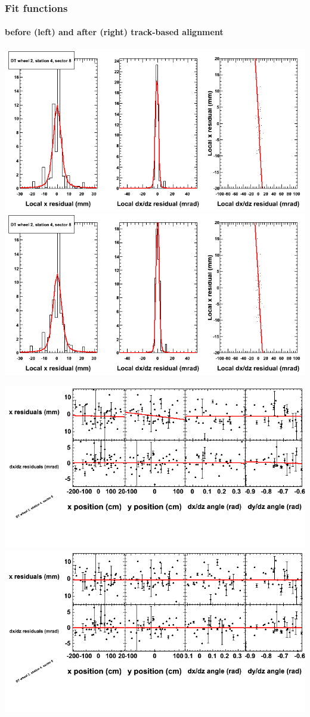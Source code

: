 \documentclass[compress]{beamer}
\begin{document}
\begin{frame}
\frametitle{Fit functions}
\framesubtitle{before (left) and after (right) track-based alignment}
\includegraphics[width=0.5\linewidth]{fitfunctions_re01/MBwhEst4sec08_bellcurves.png} \includegraphics[width=0.5\linewidth]{fitfunctions_re05/MBwhEst4sec08_bellcurves.png}

\includegraphics[width=0.5\linewidth]{fitfunctions_re01/MBwhEst4sec08_polynomials.png} \includegraphics[width=0.5\linewidth]{fitfunctions_re05/MBwhEst4sec08_polynomials.png}
\end{frame}
\end{document}
